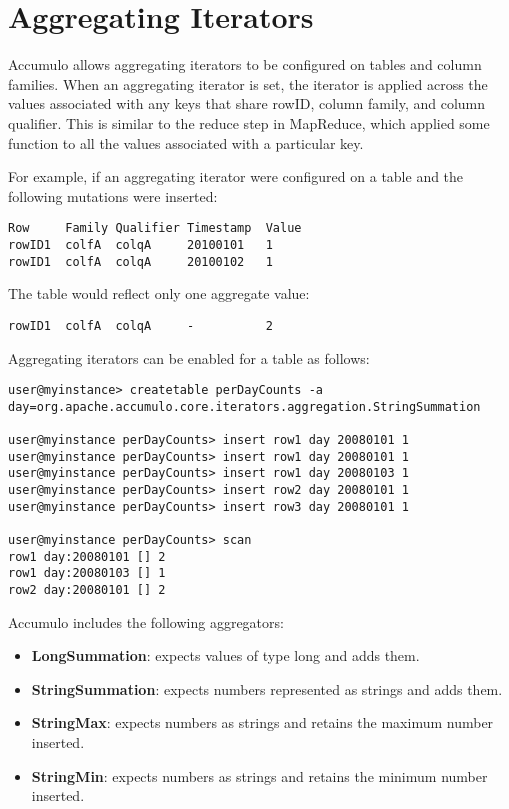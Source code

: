 \section{Aggregating Iterators}

Accumulo allows aggregating iterators to be configured on tables and column
families. When an aggregating iterator is set, the iterator is applied across the values
associated with any keys that share rowID, column family, and column qualifier.
This is similar to the reduce step in MapReduce, which applied some function to all
the values associated with a particular key.

For example, if an aggregating iterator were configured on a table and the following
mutations were inserted:

\small
\begin{verbatim}
Row     Family Qualifier Timestamp  Value
rowID1  colfA  colqA     20100101   1
rowID1  colfA  colqA     20100102   1
\end{verbatim}
\normalsize

The table would reflect only one aggregate value:

\small
\begin{verbatim}
rowID1  colfA  colqA     -          2
\end{verbatim}
\normalsize

Aggregating iterators can be enabled for a table as follows:

\small
\begin{verbatim}
user@myinstance> createtable perDayCounts -a
day=org.apache.accumulo.core.iterators.aggregation.StringSummation

user@myinstance perDayCounts> insert row1 day 20080101 1
user@myinstance perDayCounts> insert row1 day 20080101 1
user@myinstance perDayCounts> insert row1 day 20080103 1
user@myinstance perDayCounts> insert row2 day 20080101 1
user@myinstance perDayCounts> insert row3 day 20080101 1

user@myinstance perDayCounts> scan
row1 day:20080101 [] 2
row1 day:20080103 [] 1
row2 day:20080101 [] 2
\end{verbatim}
\normalsize

Accumulo includes the following aggregators:
\begin{itemize}
\item{\textbf{LongSummation}: expects values of type long and adds them.}
\item{\textbf{StringSummation}: expects numbers represented as strings and adds them.}
\item{\textbf{StringMax}: expects numbers as strings and retains the maximum number inserted.}
\item{\textbf{StringMin}: expects numbers as strings and retains the minimum number inserted.}
\end{itemize}

